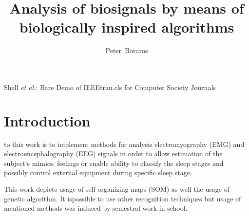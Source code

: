 \documentclass[a4paper]{IEEEtran}
\begin{document}
\title{Analysis of biosignals by means of\\ biologically inspired algorithms}

\author{Peter~Boraros%
}



%
{Shell \MakeLowercase{\textit{et al.}}: Bare Demo of IEEEtran.cls for Computer Society Journals}


\maketitle
\IEEEdisplaynotcompsoctitleabstractindextext
\IEEEpeerreviewmaketitle


\section{Introduction}
 to this work is to implement methods for analysis 
electromyography (EMG) and electroencephalography (EEG) 
signals in order to allow estimation of the subject`s mimics, 
feelings or enable ability to classify the sleep stages and possibly control 
external equipment during specific sleep stage.

This work depicts usage of self-organizing maps (SOM) as well the usage of genetic
algorithm. It ispossible to use other recognition techniques but usage of mentioned 
methods was induced by semestral work in school.


\end{document}
